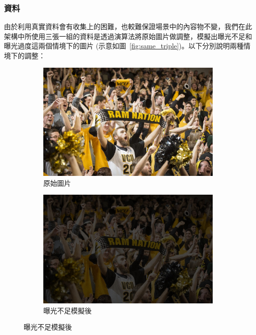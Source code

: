 \subsubsection{資料}

由於利用真實資料會有收集上的困難，也較難保證場景中的內容物不變，我們在此架構中所使用三張一組的資料是透過演算法將原始圖片做調整，模擬出曝光不足和曝光過度這兩個情境下的圖片 (示意如圖~\ref{fig:same_triple})。以下分別說明兩種情境下的調整：

\begin{figure}[htb]
\centering
\begin{subfigure}[b]{0.3\textwidth}
    \centering
    \includegraphics[width=\textwidth]{figures/same_original}
    \caption{原始圖片}
\end{subfigure}
\begin{subfigure}[b]{0.3\textwidth}
    \centering
    \includegraphics[width=\textwidth]{figures/same_dark}
    \caption{曝光不足模擬後}
\end{subfigure}

\end{figure}
